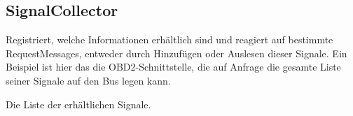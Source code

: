 \documentclass[entwurf.tex]{subfiles}
\begin{document}
		\subsection{SignalCollector}
		\label{Class:SignalCollector}
			Registriert, welche Informationen erhältlich sind und reagiert auf bestimmte RequestMessages, entweder durch Hinzufügen oder Auslesen dieser Signale. Ein Beispiel ist hier das die OBD2-Schnittstelle, die auf Anfrage die gesamte Liste seiner Signale auf den Bus legen kann.
			\begin{description}
					Die Liste der erhältlichen Signale.
			\end{description}
\end{document}
